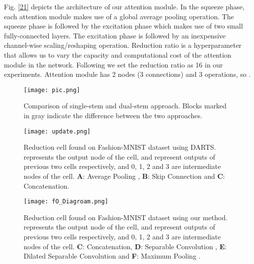 \documentclass[10pt,a4paper,conference]{IEEEtran}
\begin{document}
 Fig. \ref{21} depicts the architecture of our attention module. In the squeeze phase, each attention module makes use of a global average pooling operation. The squeeze phase is followed by the excitation phase which makes use of two small fully-connected layers. The excitation phase is followed by an inexpensive channel-wise scaling/reshaping operation. Reduction ratio  is a hyperparameter that allows us to vary the capacity and computational cost of the attention module in the network. Following \cite{hu2018squeeze:20} we set the reduction ratio  as 16 in our experiments. Attention module has 2 nodes (3 connections) and 3 operations, so .


\begin{figure}
\begin{center}
\texttt{[image: pic.png]}
\caption{Comparison of single-stem and dual-stem approach. Blocks marked in gray indicate the difference between the two approaches.}
\label{fig:7}
\end{center}
\end{figure}
\begin{figure}
\begin{center}
\texttt{[image: update.png]}
\caption{Reduction cell found on Fashion-MNIST dataset using DARTS. \textit{} represents the output node of the cell, \textit{} and \textit{} represent outputs of previous two cells respectively, and 0, 1, 2 and 3 are intermediate nodes of the cell. \textbf{A}: Average Pooling , \textbf{B}: Skip Connection and \textbf{C}: Concatenation.}
\label{fig:4}
\end{center}
\end{figure}

\begin{figure}
\begin{center}
\texttt{[image: fO\_Diagroam.png]}
\caption{Reduction cell found on Fashion-MNIST dataset using our method. \textit{} represents the output node of the cell, \textit{} and \textit{} represent outputs of previous two cells respectively, and 0, 1, 2 and 3 are intermediate nodes of the cell. \textbf{C}: Concatenation, \textbf{D}: Separable Convolution , \textbf{E}:  Dilated Separable Convolution  and \textbf{F}: Maximum Pooling .}
\label{fig:5}
\end{center}
\end{figure}
\end{document}
